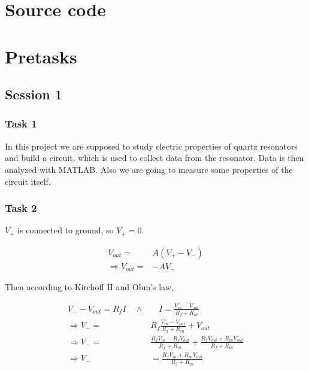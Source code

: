 \documentclass[12pt]{article}
\begin{document}
\appendix

\section{Source code}


%

\section{Pretasks}

\subsection{Session 1}

\subsubsection{Task 1}

In this project we are supposed to study electric properties of quartz resonators and build a circuit, which is used to collect data from the resonator. Data is then analyzed with MATLAB. Also we are going to measure some properties of the circuit itself.

\subsubsection{Task 2}

$V_+$ is connected to ground, so $V_+ = 0$.

\begin{align*}
V_{out} =& A(V_+ - V_-) \\
\Rightarrow V_{out} =& -AV_-
\end{align*}

Then according to Kirchoff II and Ohm's law,

\begin{align*}
V_- - V_{out} = R_f I \quad \wedge & \quad I = \frac{V_{in} - V_{out}}{R_f + R_{in}} \\
\Rightarrow V_- =& R_f \frac{V_{in} - V_{out}}{R_f + R_{in}} + V_{out} \\
\Rightarrow V_- =& \frac{R_f V_{in} - R_f V_{out}}{R_f + R_{in}} + \frac{R_f V_{out} + R_{in} V_{out}}{R_f + R_{in}} \\
\Rightarrow V_- &= \frac{R_f V_{in} + R_{in} V_{out}}{R_f + R_{in}} \\
\end{align*}
\end{document}
